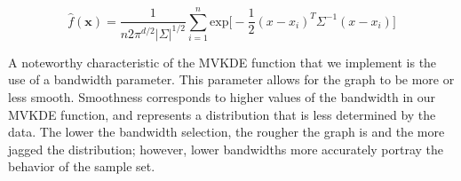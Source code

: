 \documentclass[letterpaper,12pt]{article}
\theoremstyle{definition}
\begin{document}
\begin{spacing}{1.5}
    \[\hat{f}(\mathbf{x}) = \frac{1}{n2\pi ^{d/2} |\Sigma|^{1/2}} \sum_{i=1}^n \text{exp}\big[-\frac{1}{2}(x-x_i)^T\Sigma ^{-1}(x-x_i)\big]\]
    \citet{Scott:2005}

    A noteworthy characteristic of the MVKDE function that we implement is the use of a bandwidth parameter. This parameter allows for the graph to be more or less smooth. Smoothness corresponds to higher values of the bandwidth in our MVKDE function, and represents a distribution that is less determined by the data. The lower the bandwidth selection, the rougher the graph is and the more jagged the distribution; however, lower bandwidths more accurately portray the behavior of the sample set.











\end{spacing}
\end{document}
